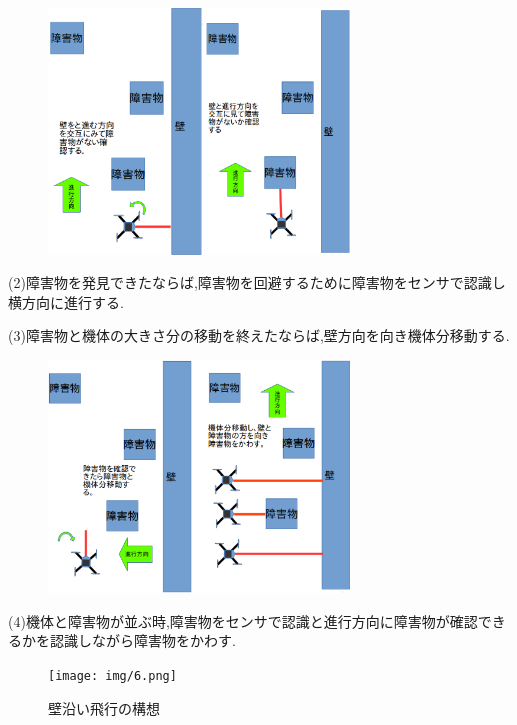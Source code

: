 \documentclass[12pt,oneside]{sotsuken_paper}
\begin{document}
\begin{figure}[H]
\begin{center}
\includegraphics[width=80mm]{img/4.png}
\end{center}
\label{fig:4}
\end{figure}

(2)障害物を発見できたならば,障害物を回避するために障害物をセンサで認識し横方向に進行する.


(3)障害物と機体の大きさ分の移動を終えたならば,壁方向を向き機体分移動する.


\begin{figure}[H]
\begin{center}
\includegraphics[width=80mm]{img/5.png}
\end{center}
\label{fig:5}
\end{figure}

(4)機体と障害物が並ぶ時,障害物をセンサで認識と進行方向に障害物が確認できるかを認識しながら障害物をかわす.


\begin{figure}[H]
\begin{center}
\texttt{[image: img/6.png]}
\end{center}
\caption{壁沿い飛行の構想}
\label{fig:6}
\end{figure}
\end{document}
